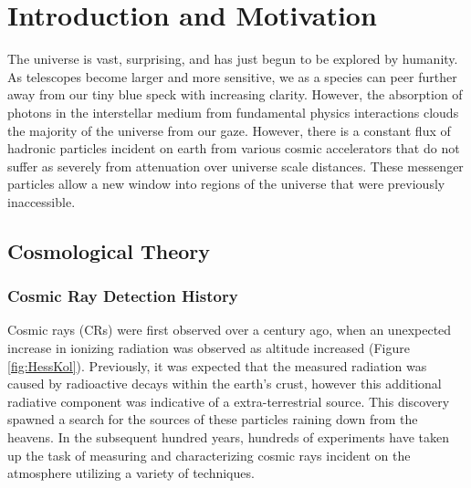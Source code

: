 



\chapter{Introduction and Motivation}
		The universe is vast, surprising, and has just begun to be explored by humanity.  As telescopes become larger and more sensitive, we as a species can peer further away from our tiny blue speck with increasing clarity.  However, the absorption of photons in the interstellar medium from fundamental physics interactions clouds the majority of the universe from our gaze.  However, there is a constant flux of hadronic particles incident on earth from various cosmic accelerators that do not suffer as severely from attenuation over universe scale distances.  These messenger particles allow a new window into regions of the universe that were previously inaccessible.
\section{Cosmological Theory}
	\subsection{Cosmic Ray Detection History}
	Cosmic rays (CRs) were first observed over a century ago, when an unexpected increase in ionizing radiation was observed as altitude increased (Figure \ref{fig:HessKol}).  Previously, it was expected that the measured radiation was caused by radioactive decays within the earth's crust, however this additional radiative component was indicative of a extra-terrestrial source.\cite{HessCosmicRay}  This discovery spawned a search for the sources of these particles raining down from the heavens.  In the subsequent hundred years, hundreds of experiments have taken up the task of measuring and characterizing cosmic rays incident on the atmosphere utilizing a variety of techniques.\cite{Olive:2016xmw}
	
